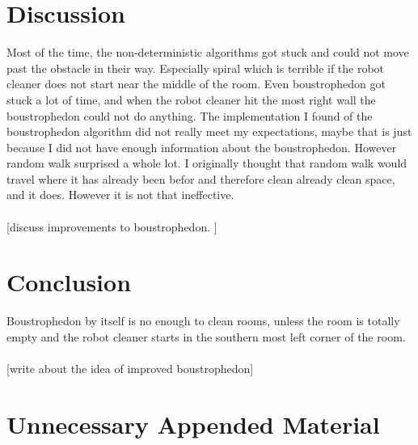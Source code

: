 \documentclass[bachelor]{kththesis}
\newcommand{\blue}[1]{{\color{blue} [#1]}}
\begin{document}
\chapter{Discussion}
Most of the time, the non-deterministic algorithms got stuck and could not move past the obstacle in their way. Especially spiral which is terrible if the robot cleaner does not start near the middle of the room. Even boustrophedon got stuck a lot of time, and when the robot cleaner hit the most right wall the boustrophedon could not do anything.
The implementation I found of the boustrophedon algorithm did not really meet my expectations, maybe that is just because I did not have enough information about the boustrophedon. However random walk surprised a whole lot. I originally thought that random walk would travel where it has already been befor and therefore clean already clean space, and it does. However it is not that ineffective.
\\\\
\blue{discuss improvements to boustrophedon. }
\chapter{Conclusion}
Boustrophedon by itself is no enough to clean rooms, unless the room is totally empty and the robot cleaner starts in the southern most left corner of the room.
\\\\
\blue{write about the idea of improved boustrophedon}
\printbibliography[heading=bibintoc] %

\appendix

\chapter{Unnecessary Appended Material}
\end{document}
